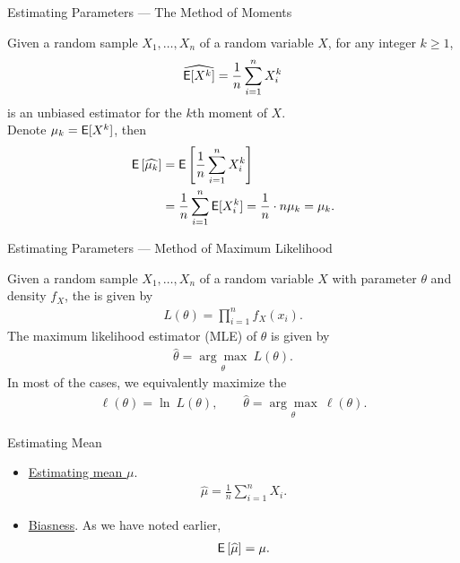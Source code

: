 \begin{frame}{Estimating Parameters --- The Method of Moments}

\justifying
{} Given a random sample $X_1, \ldots, X_n$ of a random variable $X$, for any integer $k\geq 1$, 
\begin{align*}
\widehat{\mathsf{E}[X^k]} = \frac{1}{n}\sum_{i=1}^n X_i^k
\end{align*}
is an unbiased estimator for the $k$th moment of $X$. \\
 Denote $\mu_k = \mathsf{E}[X^k]$, then
\begin{align*}
\mathsf{E}\left[\widehat{\mu_k} \right] & = \mathsf{E}\left[\frac{1}{n}\sum_{i=1}^n X_i^k \right] \\
& = \frac{1}{n}\sum_{i=1}^n \mathsf{E}[X_i^k] = \frac{1}{n} \cdot n \mu_k = \mu_k.
\end{align*}


\end{frame}


\begin{frame}{Estimating Parameters --- Method of Maximum Likelihood}

\justifying
{} Given a random sample $X_1, \ldots, X_n$ of a random variable $X$ with parameter $\theta$ and density $f_X$, the  is given by
\begin{align*}
L(\theta) = \prod_{i=1}^n f_{X}(x_i).
\end{align*}
The maximum likelihood estimator (MLE) of $\theta$ is given by
\begin{align*}
\widehat{\theta} = \underset{\theta}{\arg\max}\ L(\theta).
\end{align*}
In most of the cases, we equivalently maximize the 
\begin{align*}
\ell(\theta) = \ln\ L(\theta), \qquad \widehat{\theta} = \underset{\theta}{\arg\max}\ \ell(\theta).
\end{align*}


\end{frame}


\begin{frame}{Estimating Mean}

\begin{itemize}
	\justifying
	\item \underline{Estimating mean $\mu$}.
	\begin{align*}
	\widehat{\mu} = \frac{1}{n}\sum_{i=1}^n X_i.
	\end{align*}
	\item \underline{Biasness}. As we have noted earlier,
	\begin{align*}
	\mathsf{E}\left[\widehat{\mu}\right] = \mu.
	\end{align*}
\end{itemize}

\end{frame}

